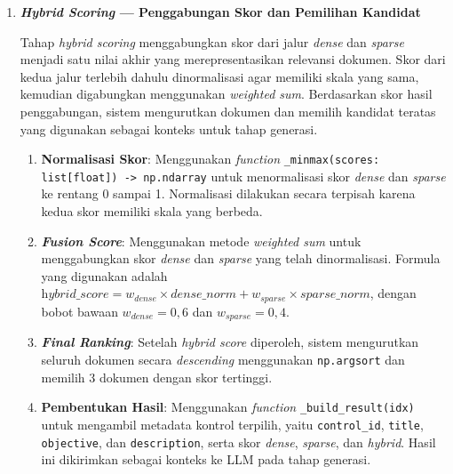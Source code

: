 \documentclass[12pt,a4paper]{article}
\begin{document}
\begin{enumerate}[leftmargin=1.1cm]
\begin{enumerate}[label=\alph*., leftmargin=1.1cm]
\item \textbf{Tokenisasi \textit{Query}}: Pada jalur \textit{sparse}, \textit{query} diproses menggunakan \texttt{tokenize()} yang sama dengan dokumen. Konsistensi tokenisasi ini memastikan bahwa proses pencocokan \textit{term} pada BM25 berjalan dengan aturan yang sama.

\item \textbf{Perhitungan \textit{Sparse Score}}: Menggunakan \textit{function} \texttt{score\_query(query: str) -> list[float]} untuk menghitung skor BM25 \textit{query} terhadap seluruh dokumen berdasarkan kombinasi \textit{term frequency}, IDF, dan normalisasi panjang dokumen.
\end{enumerate}

\item \textbf{\textit{Hybrid Scoring} --- Penggabungan Skor dan Pemilihan Kandidat}

Tahap \textit{hybrid scoring} menggabungkan skor dari jalur \textit{dense} dan \textit{sparse} menjadi satu nilai akhir yang merepresentasikan relevansi dokumen. Skor dari kedua jalur terlebih dahulu dinormalisasi agar memiliki skala yang sama, kemudian digabungkan menggunakan \textit{weighted sum}. Berdasarkan skor hasil penggabungan, sistem mengurutkan dokumen dan memilih kandidat teratas yang digunakan sebagai konteks untuk tahap generasi.

\begin{enumerate}[label=\alph*., leftmargin=1.1cm]
\item \textbf{Normalisasi Skor}: Menggunakan \textit{function} \texttt{\_minmax(scores: list[float]) -> np.ndarray} untuk menormalisasi skor \textit{dense} dan \textit{sparse} ke rentang 0 sampai 1. Normalisasi dilakukan secara terpisah karena kedua skor memiliki skala yang berbeda.

\item \textbf{\textit{Fusion Score}}: Menggunakan metode \textit{weighted sum} untuk menggabungkan skor \textit{dense} dan \textit{sparse} yang telah dinormalisasi. Formula yang digunakan adalah $\textit{hybrid\_score} = w_{\textit{dense}} \times \textit{dense\_norm} + w_{\textit{sparse}} \times \textit{sparse\_norm}$, dengan bobot bawaan $w_{\textit{dense}} = 0{,}6$ dan $w_{\textit{sparse}} = 0{,}4$.

\item \textbf{\textit{Final Ranking}}: Setelah \textit{hybrid score} diperoleh, sistem mengurutkan seluruh dokumen secara \textit{descending} menggunakan \texttt{np.argsort} dan memilih 3 dokumen dengan skor tertinggi.

\item \textbf{Pembentukan Hasil}: Menggunakan \textit{function} \texttt{\_build\_result(idx)} untuk mengambil metadata kontrol terpilih, yaitu \texttt{control\_id}, \texttt{title}, \texttt{objective}, dan \texttt{description}, serta skor \textit{dense}, \textit{sparse}, dan \textit{hybrid}. Hasil ini dikirimkan sebagai konteks ke LLM pada tahap generasi.
\end{enumerate}
\end{enumerate}
\end{document}
